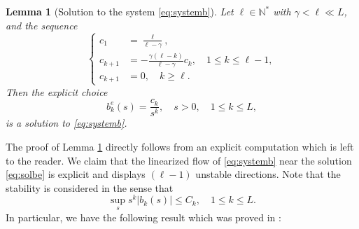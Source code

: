 \documentclass[11pt]{aims}
\newtheorem{lemma}[theorem]{Lemma}
\theoremstyle{definition}
\numberwithin{equation}{section}
\begin{document}
\begin{lemma}[Solution to the system \eqref{eq:systemb}]\label{lemm:solSysb} Let $\ell \in \mathbb{N}^*$ with $\gamma < \ell \ll L$, and the sequence
\begin{equation}\label{def:ck}
\left\{\begin{array}{ll}
c_1 &= \frac{\ell}{\ell - \gamma},\\
c_{k + 1} &= - \frac{\gamma(\ell - k)}{\ell - \gamma}c_k, \quad 1 \leq k \leq \ell-1,\\
c_{k + 1} &= 0, \quad k \geq \ell.
\end{array} \right.
\end{equation}
Then the explicit choice 
\begin{equation}\label{eq:solbe}
b_k^e(s) = \frac{c_k}{s^k}, \quad s > 0, \quad 1 \leq k \leq L,
\end{equation}
is a solution to \eqref{eq:systemb}.
\end{lemma}
The proof of Lemma \ref{lemm:solSysb} directly follows from an explicit computation which is left to the reader. We claim that the linearized flow of \eqref{eq:systemb} near the solution \eqref{eq:solbe} is explicit and displays $(\ell - 1)$ unstable directions. Note that the stability is considered in the sense that 
$$\sup_s s^k|b_k(s)| \leq C_k, \quad 1 \leq k \leq L.$$ 
In particular, we have the following result which was proved in \cite{MRRcjm15}:
\end{document}
